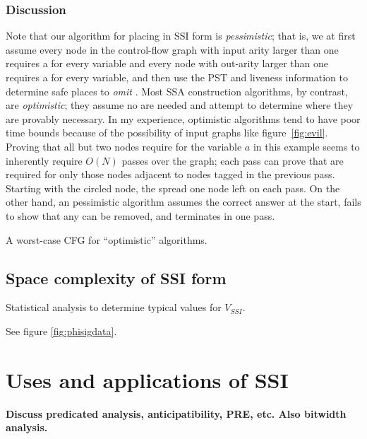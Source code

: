 \documentclass[12pt,titlepage,twoside]{article}
\newcommand*{\figscale}{1.0}
\let\oldsection\section
\renewcommand{\section}{\setcounter{figure}{0}\setcounter{table}{0}\oldsection}
\begin{document}
\subsubsection{Discussion}
Note that our algorithm for placing  in
SSI form is
\emph{pessimistic}; that is, we at first assume every node in the
control-flow graph with input arity larger than one requires a
\phifunction{} for every variable and every node with out-arity larger
than one requires a \sigfunction{} for every variable, and then use
the PST and liveness information to determine safe places to
\emph{omit} .  Most SSA construction
algorithms, by contrast, are \emph{optimistic}; they assume no
 are needed and attempt to determine where
they are provably necessary.  In my experience, optimistic algorithms tend to
have poor time bounds because of the possibility of input graphs like
figure~\vref{fig:evil}.  Proving that all but two nodes require
 for the variable $a$ in this example seems to
inherently require $O(N)$ passes over the graph; each pass can prove
that  are required for only those nodes adjacent to
nodes tagged in the previous pass.  Starting with the circled node, the
 spread one node left on each pass. On the other hand,
an pessimistic algorithm assumes the correct answer at the start, fails
to show that any  can be removed, and
terminates in one pass.

\begin{myfigure}[t]
\centering\renewcommand*{\figscale}{0.25}
\caption{A worst-case CFG for ``optimistic'' algorithms.}
\label{fig:evil}
\end{myfigure}

\subsection{Space complexity of SSI form}
\begin{myfigure}%

\caption{Statistical analysis to determine typical values for $V_{SSI}$.}
\label{fig:phisigdata}
\end{myfigure}
See figure \vref{fig:phisigdata}.%

\section{Uses and applications of SSI}
\textbf{Discuss predicated analysis, anticipatibility, PRE, etc.
	Also bitwidth analysis.}%
\end{document}
